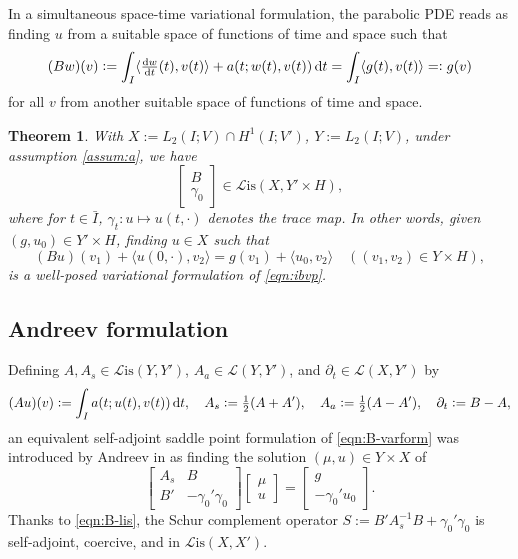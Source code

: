 \documentclass[11pt,a4paper,oneside,english]{amsart}
\numberwithin{equation}{section}
\newtheorem{theorem}{Theorem}
\numberwithin{theorem}{section}
\theoremstyle{definition}
\newcommand{\la}{\langle}
\newcommand{\ra}{\rangle}
\newcommand{\cL}{\mathcal L}
\newcommand{\Lis}{\cL\mathrm{is}}
\begin{document}
In a simultaneous space-time variational formulation, the parabolic PDE reads as
finding $u$ from a suitable space of functions of time and space such that
\begin{equation}
  \label{eqn:B-var-form}
  (Bw)(v):=\int_I \la \tfrac{\dif w}{\dif t}(t), v(t) \ra + a(t;w(t),v(t)) \dif t = \int_I \la g(t), v(t) \ra =:g(v)
\end{equation}
for all $v$ from another suitable space of functions of time and space.

\begin{theorem}
  \label{thm:varform}
  With $X:=L_2(I;{V}) \cap H^1(I;V')$, $Y:=L_2(I;{V})$, under assumption \ref{assum:a}, we have
  \begin{equation}
    \label{eqn:B-lis}
    \begin{bmatrix} B \\ \gamma_0\end{bmatrix}\in \Lis(X,Y' \times H),
  \end{equation}
  where for $t \in \bar I$, $\gamma_t\colon u \mapsto u(t,\cdot)$ denotes the trace map.
  In other words, given $(g, u_0) \in Y' \times H$, finding $u \in X$ such that
  \begin{equation}
    \label{eqn:B-varform}
    (Bu)(v_1)+\la u(0,\cdot),v_2\ra=g(v_1)+\la u_0,v_2\ra\quad ((v_1,v_2) \in Y \times H),
  \end{equation}
  is a well-posed variational formulation of \eqref{eqn:ibvp}.
\end{theorem}

\subsection{Andreev formulation}
Defining $A, A_s \in \Lis(Y,Y')$, $A_a \in \cL(Y,Y')$, and $\partial_t \in \cL(X,Y')$ by
\[
(Au)(v):=\int_I a(t;u(t),v(t)) \dif t, \quad A_s:=\tfrac12(A+A'), \quad A_a:=\tfrac12(A-A'), \quad \partial_t:=B-A,
\]
an equivalent self-adjoint saddle point formulation of \eqref{eqn:B-varform} was
introduced by Andreev in \cite{Andreev2013} as finding the solution $(\mu,u) \in Y\times X$ of
\[
  \begin{bmatrix} A_s & B\\ B' & -\gamma_0' \gamma_0 \end{bmatrix}
  \begin{bmatrix} \mu \\ u \end{bmatrix}=
  \begin{bmatrix} g \\ -\gamma_0' u_0 \end{bmatrix}.
\]
Thanks to \eqref{eqn:B-lis}, the Schur complement operator $S := B' A_s^{-1} B+\gamma_0'\gamma_0$ is self-adjoint, coercive, and in $\Lis(X, X')$.
\end{document}
